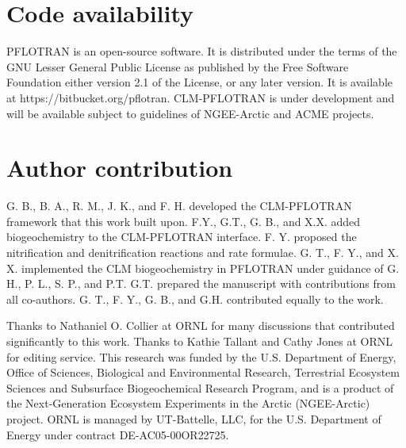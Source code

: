 \documentclass[gmd, manuscript]{copernicus}
\begin{document}


%
\section{Code availability}
PFLOTRAN is an open-source software. It is distributed under the terms of the
GNU Lesser General Public License as published by the Free Software Foundation
either version 2.1 of the License, or any later version. It is available at
https://bitbucket.org/pflotran. 
CLM-PFLOTRAN is under development and will be available subject to guidelines of NGEE-Arctic and ACME projects.

\section{Author contribution}
G. B., B. A., R. M., J. K., and F. H. developed the CLM-PFLOTRAN framework that this
work built upon. F.Y., G.T., G. B., and X.X. added biogeochemistry to the CLM-PFLOTRAN
interface. F. Y. proposed the nitrification and denitrification reactions and
rate formulae. G. T., F. Y., and X. X. implemented the CLM
biogeochemistry in PFLOTRAN under guidance of G. H., P. L., S. P., and P.T.
G.T. prepared the manuscript with contributions from all co-authors. 
G. T., F. Y., G. B., and G.H. contributed equally to the work.  

\begin{acknowledgements}
Thanks to Nathaniel O. Collier at ORNL for many discussions that contributed significantly to this work.
Thanks to Kathie Tallant and Cathy Jones at ORNL for editing service. This research was funded by the U.S. Department of Energy, Office of Sciences,
Biological and Environmental Research, Terrestrial Ecosystem Sciences and
Subsurface Biogeochemical Research Program, and is a product of the
Next-Generation Ecosystem Experiments in the Arctic (NGEE-Arctic) project.
ORNL is managed by UT-Battelle, LLC, for the U.S. Department of Energy under
contract DE-AC05-00OR22725.
\end{acknowledgements}
\end{document}
